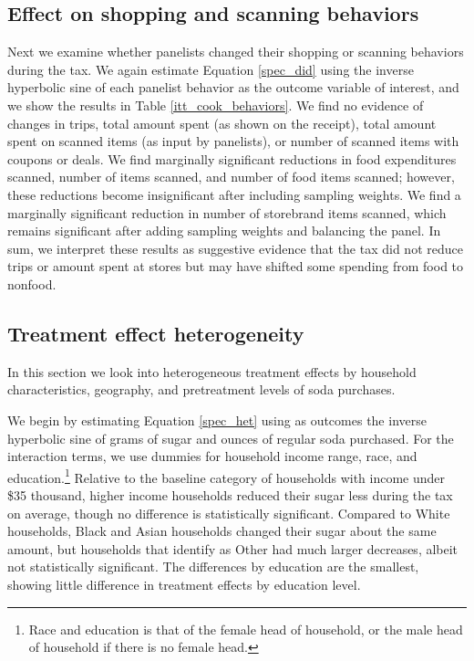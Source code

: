 \documentclass[12pt]{article}
\begin{document}
\subsection{Effect on shopping and scanning behaviors}

Next we examine whether panelists changed their shopping or scanning behaviors during the tax. We again estimate Equation \ref{spec_did} using the inverse hyperbolic sine of each panelist behavior as the outcome variable of interest, and we show the results in Table \ref{itt_cook_behaviors}. We find no evidence of changes in trips, total amount spent (as shown on the receipt), total amount spent on scanned items (as input by panelists), or number of scanned items with coupons or deals. We find marginally	significant reductions in food expenditures scanned, number of items scanned, and number of food items scanned; however, these reductions become insignificant after including sampling weights. We find a marginally significant reduction in number of storebrand items scanned, which remains significant after adding sampling weights and balancing the panel. In sum, we interpret these results as suggestive evidence that the tax did not reduce trips or amount spent at stores but may have shifted some spending from food to nonfood.

\subsection{Treatment effect heterogeneity}

In this section we look into heterogeneous treatment effects by household characteristics, geography, and pretreatment levels of soda purchases.

We begin by estimating Equation \ref{spec_het} using as outcomes the inverse hyperbolic sine of grams of sugar and ounces of regular soda purchased. For the interaction terms, we use dummies for household income range, race, and education.\footnote{Race and education is that of the female head of household, or the male head of household if there is no female head.} Relative to the baseline category of households with income under \$35 thousand, higher income households reduced their sugar less during the tax on average, though no difference is statistically significant. Compared to White households, Black and Asian households changed their sugar about the same amount, but households that identify as Other had much larger decreases, albeit not statistically significant. The differences by education are the smallest, showing little difference in treatment effects by education level.
\end{document}
